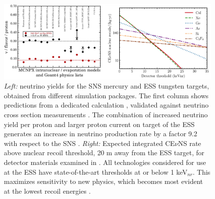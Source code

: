 \begin{figure}[htb!]
\begin{center}
\includegraphics[width=5.1in]{fig1.pdf}
\caption{\label{fig:fig1}\scriptsize {\it Left:} neutrino yields for the SNS mercury and
  ESS tungsten targets, obtained from different simulation packages. The first column shows predictions from a dedicated
  calculation \cite{burman,report}, validated against neutrino cross
  section measurements \cite{louis}. The combination of increased neutrino yield per proton and larger proton current on target of the ESS generates an increase in neutrino production rate by a factor 9.2 with respect to the SNS \cite{ESS}. {\it Right:} Expected integrated  CE$\nu$NS rate above nuclear recoil threshold, 20 m away from the ESS target, for detector materials examined in \cite{ESS}. All technologies considered for use at the ESS have state-of-the-art thresholds at or below 1 keV$_{nr}$. This maximizes sensitivity to new physics, which becomes most evident at the lowest recoil energies \cite{ESS}. }
\end{center}
\end{figure}

